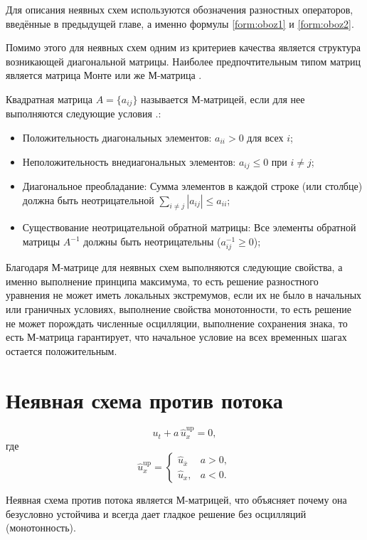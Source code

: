 \documentclass[a4paper,14pt]{extreport}
\begin{document}
Для описания неявных схем используются обозначения разностных операторов, введённые в предыдущей главе, а именно формулы \ref{form:oboz1} и \ref{form:oboz2}. 

Помимо этого для неявных схем одним из критериев качества является структура возникающей диагональной матрицы. Наиболее предпочтительным типом матриц является матрица Монте или же М-матрица \cite{kobelkov}.

Квадратная матрица $A=\{a_{ij}\}$ называется М-матрицей, если для нее выполняются следующие условия \cite{kobelkov}.:
\begin{itemize}
	\item Положительность диагональных элементов: $a_{ii} > 0$ для всех $i$;
	\item Неположительность внедиагональных элементов: $a_{ij} \leq 0$ при $i \neq j$;
	\item Диагональное преобладание: Сумма элементов в каждой строке (или столбце) должна быть неотрицательной $\sum_{i \neq j}|a_{ij}| \leq a_{ii}$;
	\item Существование неотрицательной обратной матрицы: Все элементы обратной матрицы $A^{-1}$ должны быть неотрицательны ($a_{ij}^{-1} \geq 0$);
\end{itemize} 

Благодаря М-матрице для неявных схем выполняются следующие свойства, а именно выполнение принципа максимума, то есть решение разностного уравнения не может иметь локальных экстремумов, если их не было в начальных или граничных условиях, выполнение свойства монотонности, то есть решение не может порождать численные осцилляции, выполнение сохранения знака, то есть М-матрица гарантирует, что начальное условие на всех временных шагах остается положительным.
 

\section*{Неявная схема против потока}
\begin{equation}
	u_t + a \, \hat{u}_x^{\mathrm{up}} = 0,    
\end{equation}
где
\[
\hat{u}_x^{\mathrm{up}} =
\begin{cases}
	\hat{u}_{\bar{x}} & a > 0, \\
	\hat{u}_x,      & a < 0.
\end{cases}
\]

Неявная схема против потока является М-матрицей, что объясняет почему она безусловно устойчива и всегда дает гладкое решение без осцилляций (монотонность).
\end{document}
